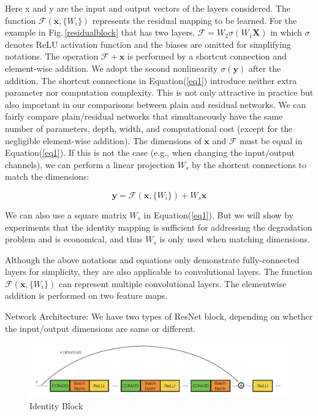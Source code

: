 Here x and y are the input and output vectors of the layers considered. The function $\mathcal{F} (\mathbf{x}, \{W_i\})$ represents the residual mapping to be learned. For the example in Fig.\,\ref{residualblock} that has two layers, $\mathcal{F}=W_2\sigma(W_1\mathbf{X})$ in which $\sigma$ denotes ReLU activation function and the biases are omitted for simplifying notations. The operation $\mathcal{F} + \mathbf{x}$ is performed by a shortcut connection and element-wise addition. We adopt the second nonlinearity $\sigma(\mathbf{y})$ after the addition. The shortcut connections in Equation(\ref{eq1}) introduce neither extra parameter nor computation complexity. This is not only attractive in practice but also important in our comparisons between plain and residual networks. We can fairly compare plain/residual networks that simultaneously have the same number of parameters, depth, width, and computational cost (except for the negligible element-wise addition). 
The dimensions of $\mathbf{x}$ and $\mathcal{F}$ must be equal in Equation(\ref{eq1}). If this is not the case (e.g., when changing the input/output channels), we can perform a linear projection $W_s$ by the shortcut connections to match the dimensions: 

\begin{equation} \label{eq2}
\mathbf{y} = \mathcal{F} (\mathbf{x}, \{W_i\}) + W_s \mathbf{x}
\end{equation}

We can also use a square matrix $W_s$ in Equation(\ref{eq1}). But we will show by experiments that the identity mapping is sufficient for addressing the degradation problem and is economical, and thus $W_s$ is only used when matching dimensions. 

Although the above notations and equations only demonstrate fully-connected layers for simplicity, they are also applicable to convolutional layers. The function $\mathcal{F} (\mathbf{x}, \{W_i\})$ can represent multiple convolutional layers. The elementwise addition is performed on two feature maps.

Network Architecture:
We have two types of ResNet block, depending on whether the input/output dimensions are same or different.

\begin{figure}[h]
	\centering
	\includegraphics[width=\textwidth]{Figs/identityblock.png}
    \caption{Identity Block}
    \label{identityblock}
\end{figure}

